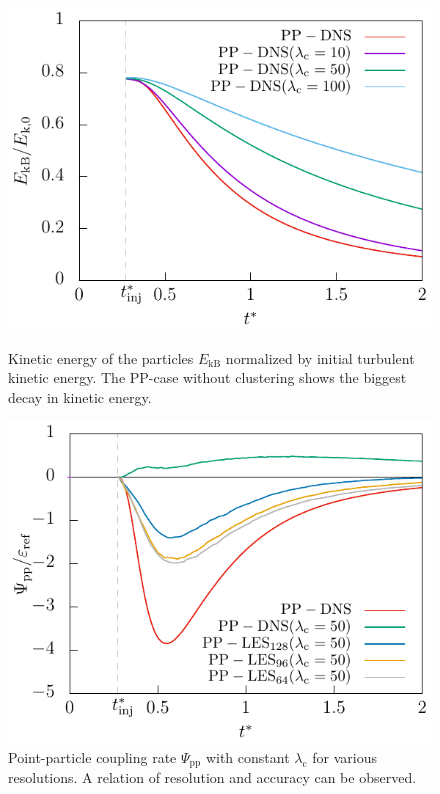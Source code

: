 \documentclass[11pt,a4paper,openany,oneside,parskip=half*]{article}
\begin{document}
\begin{figure}[]
    \centering
    \begin{minipage}[t]{.5\textwidth}
         \centering
        \includegraphics[width=\linewidth]{./Abbildungen/256/particlekineticenergy_time.pdf}
        \caption{Kinetic energy of the particles $E_\mathrm{kB}$ normalized by initial turbulent kinetic energy. The PP-case without clustering shows the biggest decay in kinetic energy. }
        \label{particlekineticenergy_time_256}
    \end{minipage}%
    \begin{minipage}[t]{0.5\textwidth}
        \centering
        \includegraphics[width=\linewidth]{./Abbildungen/vergleich_coupling_time50.pdf}
        \caption{Point-particle coupling rate $\Psi_\mathrm{pp}$ with constant $\lambda_\mathrm{c}$ for various resolutions. A relation of resolution and accuracy can be observed.}
        \label{vergleich_coupling_time_256}
        \end{minipage}
\end{figure}
\end{document}
